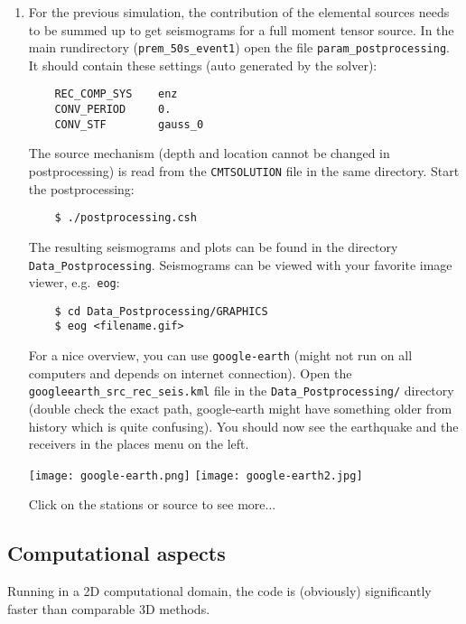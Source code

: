 \documentclass{article}
\begin{document}
\begin{enumerate}
    \item For the previous simulation, the contribution of the elemental sources needs
    to be summed up to get seismograms for a full moment tensor source. In the
    main rundirectory (\verb|prem_50s_event1|) open the file
    \verb|param_postprocessing|. It should contain these settings (auto generated by the
    solver):
    \begin{verbatim}
    REC_COMP_SYS    enz
    CONV_PERIOD     0.
    CONV_STF        gauss_0
    \end{verbatim}
    The source mechanism (depth and location cannot be changed in postprocessing) is read
    from the \verb|CMTSOLUTION| file in the same directory. Start the postprocessing:
    \begin{verbatim}
    $ ./postprocessing.csh
    \end{verbatim}
    The resulting seismograms and plots can be found in the directory
    \verb|Data_Postprocessing|. Seismograms can be viewed with your favorite image viewer,
    e.g.\ \verb|eog|:
    \begin{verbatim}
    $ cd Data_Postprocessing/GRAPHICS
    $ eog <filename.gif>
    \end{verbatim}
    For a nice overview, you can use \verb|google-earth| (might not run on all computers
    and depends on internet connection). Open the \verb|googleearth_src_rec_seis.kml| file
    in the \verb|Data_Postprocessing/| directory (double check the exact path,
    google-earth might have something older from history which is quite confusing).
    You should now see the earthquake and the receivers in the places menu on the left.

    \begin{center}
    \texttt{[image: google-earth.png]}
    \hspace{5mm}
    \texttt{[image: google-earth2.jpg]}
    \end{center}

    Click on the stations or source to see more...

\end{enumerate}

\subsection{Computational aspects}

Running in a 2D computational domain, the code is (obviously) significantly faster
than comparable 3D methods.
\end{document}
